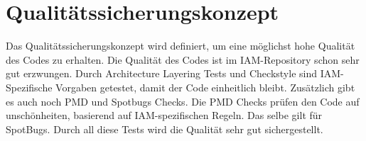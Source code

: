 \section{Qualitätssicherungskonzept}
Das Qualitätssicherungskonzept wird definiert, um eine möglichst hohe Qualität des Codes zu erhalten.
\newline
Die Qualität des Codes ist im IAM-Repository schon sehr gut erzwungen. Durch Architecture Layering Tests und Checkstyle sind IAM-Spezifische Vorgaben getestet, damit der Code einheitlich bleibt. Zusätzlich gibt es auch noch PMD und Spotbugs Checks. Die PMD Checks prüfen den Code auf unschönheiten, basierend auf IAM-spezifischen Regeln. Das selbe gilt für SpotBugs.
\newline
Durch all diese Tests wird die Qualität sehr gut sichergestellt. 







